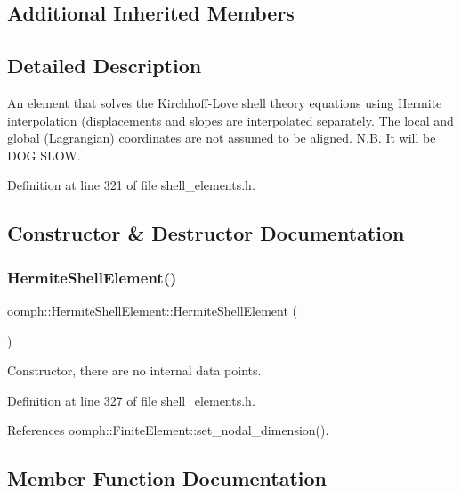 \subsection*{Additional Inherited Members}


\subsection{Detailed Description}
An element that solves the Kirchhoff-\/\+Love shell theory equations using Hermite interpolation (displacements and slopes are interpolated separately. The local and global (Lagrangian) coordinates are not assumed to be aligned. N.\+B. It will be D\+OG S\+L\+OW. 

Definition at line 321 of file shell\+\_\+elements.\+h.



\subsection{Constructor \& Destructor Documentation}
\mbox{\label{classoomph_1_1HermiteShellElement_afa11d38b6dd8d1705a6c8f4faf2b99a7}} 
\subsubsection{\texorpdfstring{Hermite\+Shell\+Element()}{HermiteShellElement()}}
{\footnotesize\ttfamily oomph\+::\+Hermite\+Shell\+Element\+::\+Hermite\+Shell\+Element (\begin{DoxyParamCaption}{ }\end{DoxyParamCaption})\hspace{0.3cm}{\ttfamily [inline]}}



Constructor, there are no internal data points. 



Definition at line 327 of file shell\+\_\+elements.\+h.



References oomph\+::\+Finite\+Element\+::set\+\_\+nodal\+\_\+dimension().



\subsection{Member Function Documentation}
\mbox{\label{classoomph_1_1HermiteShellElement_af2313040b66727088dc044738b652677}} 
